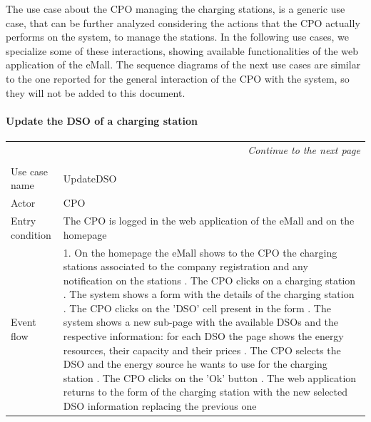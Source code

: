 The use case about the CPO managing the charging stations, is a generic use case, that can be further analyzed considering the actions that the CPO actually performs on the system, to manage the stations. In the following use cases, we specialize some of these interactions, showing available functionalities of the web application of the eMall. The sequence diagrams of the next use cases are similar to the one reported for the general interaction of the CPO with the system, so they will not be added to this document.

\paragraph{Update the DSO of a charging station}
\begin{center}
    \begin{longtable}{p{4cm} p{11cm}}
    \multicolumn{2}{r}{\itshape{Continue to the next page}}\\
    \endfoot 
    \\
    \endlastfoot
    \hline
     Use case name &  UpdateDSO\\
     \hline
     Actor & CPO \\
     \hline
     Entry condition & The CPO is logged in the web application of the eMall and on the homepage \\
     \hline
     Event flow &   1. On the homepage the eMall shows to the CPO the charging stations associated to the company                   registration and any notification on the stations \newline
                    2. The CPO clicks on a charging station \newline 
                    3. The system shows a form with the details of the charging station \newline
                    4. The CPO clicks on the 'DSO' cell present in the form \newline
                    5. The system shows a new sub-page with the available DSOs and the respective information: for each DSO the page shows the energy resources, their capacity and their prices \newline
                    6. The CPO selects the DSO and the energy source he wants to use for the charging station \newline
                    7. The CPO clicks on the 'Ok' button \newline
                    8. The web application returns to the form of the charging station with the new selected DSO information replacing the previous one \newline

\end{longtable}
\end{center}

